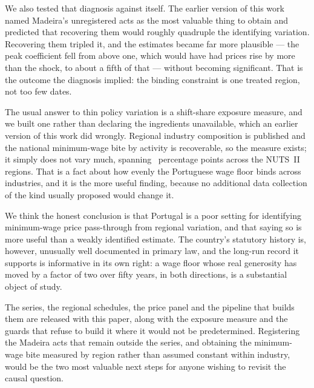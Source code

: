 We also tested that diagnosis against itself. The earlier version of this work
named Madeira's unregistered acts as the most valuable thing to obtain and
predicted that recovering them would roughly quadruple the identifying
variation. Recovering them tripled it, and the estimates became far more
plausible --- the peak coefficient fell from above one, which would have had
prices rise by more than the shock, to about a fifth of that --- without becoming
significant. That is the outcome the diagnosis implied: the binding constraint
is one treated region, not too few dates.

The usual answer to thin policy variation is a shift-share exposure measure, and
we built one rather than declaring the ingredients unavailable, which an earlier
version of this work did wrongly. Regional industry composition is published and
the national minimum-wage bite by activity is recoverable, so the measure
exists; it simply does not vary much, spanning \ExposureSpreadPP{}~percentage
points across the \ExposureRegions{} NUTS~II regions. That is a fact about how
evenly
the Portuguese wage floor binds across industries, and it is the more useful
finding, because no additional data collection of the kind usually proposed
would change it.

We think the honest conclusion is that Portugal is a poor setting for
identifying minimum-wage price pass-through from regional variation, and that
saying so is more useful than a weakly identified estimate. The country's
statutory history is, however, unusually well documented in primary law, and the
long-run record it supports is informative in its own right: a wage floor whose
real generosity has moved by a factor of two over fifty years, in both
directions, is a substantial object of study.

The series, the regional schedules, the price panel and the pipeline that builds
them are released with this paper, along with the exposure measure and the
guards that refuse to build it where it would not be predetermined. Registering
the Madeira acts that remain outside the series, and obtaining the minimum-wage
bite measured by region rather than assumed constant within industry, would be
the two most valuable next steps for anyone wishing to revisit the causal
question.
